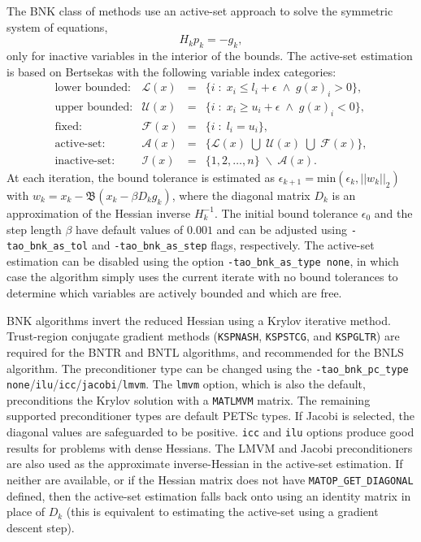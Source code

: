 \documentclass[]{book}
\begin{document}
The BNK class of methods use an active-set approach to solve the symmetric system of equations,
\[
H_k p_k = -g_k,
\]
only for inactive variables in the interior of the bounds. The active-set estimation is based on 
Bertsekas \cite{bertsekas:projected} with the following variable index categories:
\[
\begin{array}{rlll} \displaystyle
\mbox{lower bounded}: & \mathcal{L}(x) & = & \{ i \; : \; x_i \leq l_i + \epsilon \; \land \; g(x)_i > 0 \}, \\
\mbox{upper bounded}: & \mathcal{U}(x) & = & \{ i \; : \; x_i \geq u_i + \epsilon \; \land \; g(x)_i < 0 \}, \\
\mbox{fixed}: & \mathcal{F}(x) & = & \{ i \; : \; l_i = u_i \}, \\
\mbox{active-set}: & \mathcal{A}(x) & = & \{ \mathcal{L}(x) \; \bigcup \; \mathcal{U}(x) \; \bigcup \; \mathcal{F}(x) \}, \\
\mbox{inactive-set}: & \mathcal{I}(x) & = & \{ 1,2,\ldots,n \} \; \backslash \; \mathcal{A}(x).
\end{array}
\]
At each iteration, the bound tolerance is estimated as $\epsilon_{k+1} = \mbox{min}(\epsilon_k, ||w_k||_2)$ 
with $w_k = x_k - \mathfrak{B}(x_k - \beta D_k g_k)$, where the diagonal matrix $D_k$ is an approximation 
of the Hessian inverse $H_k^{-1}$. The initial bound tolerance $\epsilon_0$ and the step length $\beta$ 
have default values of $0.001$ and can be adjusted using {\tt -tao\_bnk\_as\_tol} and 
{\tt -tao\_bnk\_as\_step} flags, respectively. The active-set estimation can be disabled using the option 
{\tt -tao\_bnk\_as\_type none}, in which case the algorithm simply uses the current iterate with no bound 
tolerances to determine which variables are actively bounded and which are free.

BNK algorithms invert the reduced Hessian using a Krylov iterative method. Trust-region conjugate gradient 
methods ({\tt KSPNASH}, {\tt KSPSTCG}, and {\tt KSPGLTR}) are required for the BNTR and BNTL algorithms, 
and recommended for the BNLS algorithm. The preconditioner type can be changed using the 
{\tt -tao\_bnk\_pc\_type} {\tt none}/{\tt ilu}/{\tt icc}/{\tt jacobi}/{\tt lmvm}. The {\tt lmvm} option, which is 
also the default, preconditions the Krylov solution with a {\tt MATLMVM} matrix. The remaining supported 
preconditioner types are default PETSc types. If Jacobi is selected, the diagonal values are safeguarded to be positive. 
{\tt icc} and {\tt ilu} options produce good results for problems with dense Hessians. The LMVM and Jacobi 
preconditioners are also used as the approximate inverse-Hessian in the active-set estimation. 
If neither are available, or if the Hessian matrix does not have {\tt MATOP\_GET\_DIAGONAL} defined, then the 
active-set estimation falls back onto using an identity matrix in place of $D_k$ (this is equivalent to 
estimating the active-set using a gradient descent step).
\end{document}
